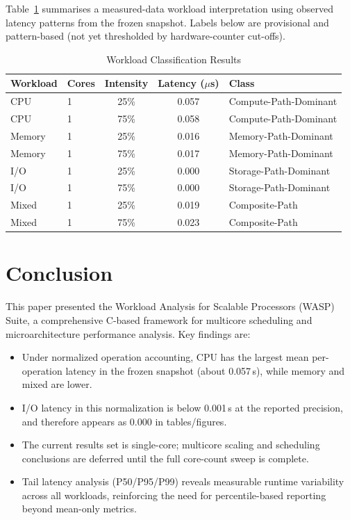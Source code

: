 \documentclass[conference]{IEEEtran}
\begin{document}
Table~\ref{tab:classification} summarises a measured-data workload
interpretation using observed latency patterns from the frozen snapshot.
Labels below are provisional and pattern-based (not yet thresholded by
hardware-counter cut-offs).

\begin{table}[htbp]
\caption{Workload Classification Results}
\label{tab:classification}
\begin{center}
\begin{tabular}{llccl}
\toprule
\textbf{Workload} & \textbf{Cores} & \textbf{Intensity} & \textbf{Latency ($\mu$s)} & \textbf{Class} \\
\midrule
CPU    & 1 & 25\% & 0.057 & Compute-Path-Dominant \\
CPU    & 1 & 75\% & 0.058 & Compute-Path-Dominant \\
Memory & 1 & 25\% & 0.016 & Memory-Path-Dominant \\
Memory & 1 & 75\% & 0.017 & Memory-Path-Dominant \\
I/O    & 1 & 25\% & 0.000 & Storage-Path-Dominant \\
I/O    & 1 & 75\% & 0.000 & Storage-Path-Dominant \\
Mixed  & 1 & 25\% & 0.019 & Composite-Path \\
Mixed  & 1 & 75\% & 0.023 & Composite-Path \\
\bottomrule
\end{tabular}
\end{center}
\end{table}

\section{Conclusion}
\label{sec:conclusion}

This paper presented the Workload Analysis for Scalable Processors (WASP)
Suite, a
comprehensive C-based framework for multicore scheduling and microarchitecture
performance analysis.  Key findings are:

\begin{itemize}
  \item Under normalized operation accounting, CPU has the largest mean
        per-operation latency in the frozen snapshot (about 0.057\,\textmu{}s),
        while memory and mixed are lower.
  \item I/O latency in this normalization is below 0.001\,\textmu{}s at the
        reported precision, and therefore appears as 0.000 in tables/figures.
  \item The current results set is single-core; multicore scaling and
        scheduling conclusions are deferred until the full core-count sweep is
        complete.
  \item Tail latency analysis (P50/P95/P99) reveals measurable runtime
        variability across all workloads, reinforcing the need for
        percentile-based reporting beyond mean-only metrics.
\end{itemize}
\end{document}
